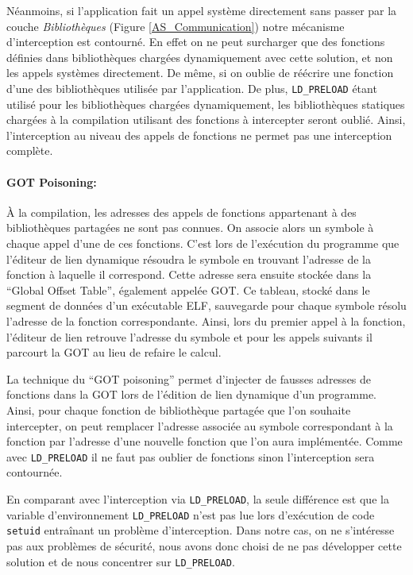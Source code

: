 Néanmoins, si l'application fait un appel système directement sans passer par la
couche \textit{Bibliothèques} (Figure \ref{AS_Communication}) notre mécanisme
d'interception est contourné. En effet on ne peut surcharger que des fonctions
définies dans bibliothèques chargées dynamiquement avec cette solution, et non
les appels systèmes directement. De même, si on oublie de réécrire une fonction
d'une des bibliothèques utilisée par l'application. De
plus, \texttt{LD\_PRELOAD} étant utilisé pour les bibliothèques chargées
dynamiquement, les bibliothèques statiques chargées à la compilation utilisant
des fonctions à intercepter seront oublié. Ainsi, l'interception au niveau des
appels de fonctions ne permet pas une interception complète.

\paragraph{GOT Poisoning:}

À la compilation, les adresses des appels de fonctions appartenant à des bibliothèques partagées ne sont pas connues. On associe alors un symbole à chaque appel d'une de ces fonctions. C'est lors de l'exécution du programme que l'éditeur de lien dynamique résoudra le symbole en trouvant l'adresse de la fonction à laquelle il correspond. Cette adresse sera ensuite stockée dans la ``Global Offset Table''\citep{ELF}, également appelée GOT. Ce tableau, stocké dans le segment de données d'un exécutable ELF, sauvegarde pour chaque symbole résolu l'adresse de la fonction correspondante. Ainsi, lors du premier appel à la fonction, l'éditeur de lien retrouve l'adresse du symbole et pour les appels suivants il parcourt la GOT au lieu de refaire le calcul.

La technique du ``GOT poisoning'' \citep{GOT_poisoning} permet d'injecter de fausses adresses de fonctions dans la GOT lors de l'édition de lien dynamique d'un programme. Ainsi, pour chaque fonction de bibliothèque partagée que l'on souhaite intercepter, on peut remplacer l'adresse associée au symbole correspondant à la fonction par l'adresse d'une nouvelle fonction que l'on aura implémentée. Comme avec \texttt{LD\_PRELOAD} il ne faut pas oublier de fonctions sinon l'interception sera contournée.

En comparant avec l'interception via \texttt{LD\_PRELOAD}, la seule différence est que la variable d'environnement \texttt{LD\_PRELOAD} n'est pas lue lors d'exécution de code \texttt{setuid} entraînant un problème d'interception. Dans notre cas, on ne s'intéresse pas aux problèmes de sécurité, nous avons donc choisi de ne pas développer cette solution et de nous concentrer sur \texttt{LD\_PRELOAD}.

\vspace{0.5cm}
